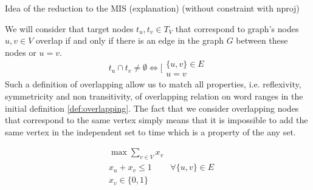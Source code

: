 Idea of the reduction to the MIS (explanation) (without constraint with nproj)

We will consider that target nodes \( t_u, t_v \in T_{V} \) that correspond to graph's nodes \( u, v \in V \) overlap
if and only if there is an edge in the graph \( G \) between these nodes or \( u = v \).
\[
    t_u \cap t_v \neq \emptyset \Leftrightarrow
    \Biggl[
    \begin{array}{l}
        \{ u, v \} \in E \\
        u = v
    \end{array}
\]
Such a definition of overlapping allow us to match all properties, i.e. reflexivity, symmetricity and non transitivity,
of overlapping relation on word ranges in the initial definition \ref{def:overlapping}. The fact that we consider
overlapping nodes that correspond to the same vertex simply means that it is impossible to
add the same vertex in the independent set to time which is a property of the any set.

\begin{equation} \label{eq:reduction_without_nproj}
    \begin{aligned}
         & \max \sum\limits_{v \in V} x_v                          \\
         & x_u + x_v \leq 1               & \forall \{u, v\} \in E \\
         & x_v \in \{0, 1\}
    \end{aligned}
\end{equation}

